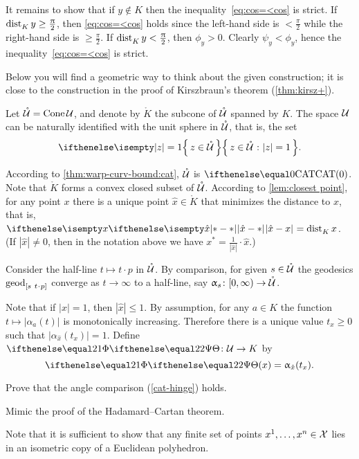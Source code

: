 It remains to show that if $y\notin K$ 
then the inequality~\ref{eq:cos=<cos}
is strict.
If $\distfun{K}{y}{}\ge\tfrac\pi2$, then \ref{eq:cos=<cos} holds since 
the left-hand side is $<\tfrac\pi2$
while the right-hand side is $\ge \tfrac\pi2$.
If $\mathop{\rm dist}\nolimits_{K}^{{}}{y}{}<\tfrac{\uppi}2$, then $\phi_y>0$. Clearly $\psi_y<\phi_y$,
hence the inequality~\ref{eq:cos=<cos} is strict.
\qeds

Below you will find a geometric way to think about the given construction; 
it is close to the construction in the proof of Kirszbraun's theorem (\ref{thm:kirsz+}).

Let $\mathring{\mathcal{U}}=\mathop{\rm Cone}\nolimits \mathcal{U}$, and 
denote by $\mathring{K}$ the subcone of $\mathring{\mathcal{U}}$ spanned by $K$.
The space $\mathcal{U}$ can be naturally identified with the unit sphere in $\mathring{\mathcal{U}}$, 
that is, the set 
\[\set{z\in \mathring{\spc{U}}}{|z|=1}.\]

According to \ref{thm:warp-curv-bound:cat}, $\mathring{\mathcal{U}}$ is $\CAT0$.
Note that $\mathring{K}$ forms a convex closed subset of $\mathring{\mathcal{U}}$.
According to \ref{lem:closest point}, for any point $x$ there is a unique point $\hat x\in \mathring{K}$
that minimizes the distance to $x$,
that is, $\dist{\hat x}{x}{}=\distfun{K}{x}{}$.
(If $|\hat x|\ne0$, then in the notation above we have
$x^*=\tfrac1{|\hat x|}\cdot\hat x$.)

Consider the half-line $t\mapsto t\cdot p$ in  $\mathring{\mathcal{U}}$.
By comparison, 
for given $s\in \mathring{\spc{U}}$
the geodesics $\geod_{[s\ t\cdot p]}$ converge as $t\to\infty$ to a half-line, 
say $\alpha_s\:[0,\infty)\to \mathring{\spc{U}}$.



Note that if $|x|=1$, then $|\hat x|\le 1$.
By assumption, for any $a\in K$ the function $t\mapsto |\alpha_a(t)|$ is monotonically increasing.
Therefore there is a unique value $t_x\ge 0$ such that
$|\alpha_{\hat x}(t_x)|=1$.
Define $\map[2]\:\spc{U}\to K$
 by 
\[\map[2](x)=\alpha_{\hat x}(t_x).\]

Prove that the angle comparison (\ref{cat-hinge}) holds.

Mimic the proof of the Hadamard--Cartan theorem.

Note that it is sufficient to show that any finite set of points $x^1,\dots,x^n\in\spc{X}$ lies in an isometric copy of a Euclidean polyhedron.

